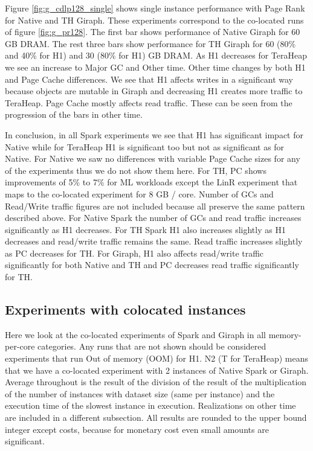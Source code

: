 Figure \ref{fig:g_cdlp128_single} shows single instance performance with Page Rank for Native and TH Giraph. These experiments correspond to the co-located runs of figure \ref{fig:g_pr128}. The first bar shows performance of Native Giraph for 60 GB DRAM. The rest three bars show performance for TH Giraph for 60 (80\% and 40\% for H1) and 30 (80\% for H1) GB DRAM. As H1 decreases for TeraHeap we see an increase to Major GC  and Other time. Other time changes by both H1 and Page Cache differences. We see that H1 affects writes in a significant way because objects are mutable in Giraph and decreasing H1 creates more traffic to TeraHeap. Page Cache mostly affects read traffic. These can be seen from the progression of the bars in other time.

In conclusion, in all Spark experiments we see that H1 has significant impact for Native while for TeraHeap H1 is significant too but not as significant as for Native. For Native we saw no differences with variable Page Cache sizes for any of the experiments thus we do not show them here. For TH, PC shows improvements of 5\% to 7\% for ML workloads except the LinR experiment that maps to the co-located experiment for 8 GB / core. Number of GCs and Read/Write traffic figures are not included because all preserve the same pattern described above. For Native Spark the number of GCs and read traffic increases significantly as H1 decreases. For TH Spark H1 also increases slightly as H1 decreases and read/write traffic remains the same. Read traffic increases slightly as PC decreases for TH. For Giraph, H1 also affects read/write traffic significantly for both Native and TH and PC decreases read traffic significantly for TH.

\subsection{Experiments with colocated instances}

Here we look at the co-located experiments of Spark and Giraph in all memory-per-core categories.
Any runs that are not shown should be considered experiments that run Out of memory (OOM) for H1.
N2 (T for TeraHeap) means that we have a co-located experiment with 2 instances of Native Spark or Giraph.
Average throughout is the result of the division of the result of the multiplication of the number of instances with dataset size (same per instance) and the execution time of the slowest instance in execution. Realizations on other time are included in a different subsection.
All results are rounded to the upper bound integer except costs, because for monetary cost even small amounts are significant.

